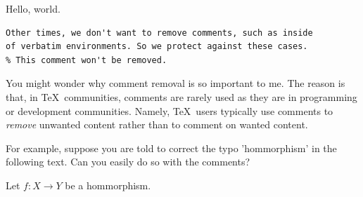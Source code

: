\documentclass{article}
\begin{document}
Hello, world.

\begin{verbatim}
Other times, we don't want to remove comments, such as inside
of verbatim environments. So we protect against these cases.
% This comment won't be removed.
\end{verbatim}

You might wonder why comment removal is so important to
me. The reason is that, in \TeX\ communities, comments are
rarely used as they are in programming or development
communities. Namely, \TeX\ users typically use comments to
\emph{remove} unwanted content rather than to comment on
wanted content.

For example, suppose you are told to correct the typo
'hommorphism' in the following text. Can you easily do so
with the comments?

Let $f:X \to Y$ be a hommorphism.
\end{document}
